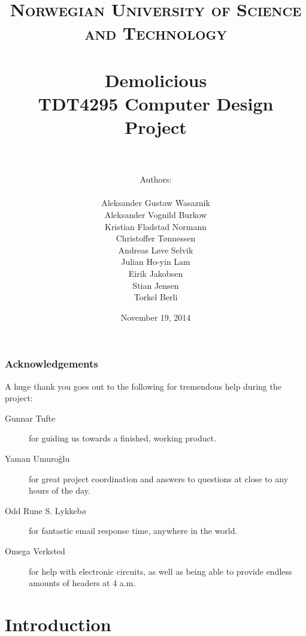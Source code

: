 \documentclass[a4paper, fontsize=11pt]{report} %
\title{ 
\normalfont \normalsize 
\textsc{Norwegian University of Science and Technology} \\ [25pt] %
\horrule{0.5pt} \\[0.4cm] %
\huge \textbf{Demolicious} \\ %
TDT4295 Computer Design Project\\
\horrule{2pt} \\[0.5cm] %
}
\author{Authors:\\ \\
Aleksander Gustaw Wasaznik\\
Aleksander Vognild Burkow\\
Kristian Fladstad Normann\\
Christoffer Tønnessen\\
Andreas Løve Selvik\\
Julian Ho-yin Lam\\
Eirik Jakobsen\\
Stian Jensen\\
Torkel Berli}
\date{\normalsize November 19, 2014}
\begin{document}

\maketitle

\newpage

\listoftodos
{}
\newpage



\thispagestyle{firststyle}

\newpage



\newpage

\section*{Acknowledgements}
A huge thank you goes out to the following for tremendous help during the project:

\vspace*{\fill}
\begin{description}

    \item[Gunnar Tufte]
        for guiding us towards a finished, working product.
    \item[Yaman Umuroğlu]
        for great project coordination and answers to questions at close to any hours of the day.
    \item[Odd Rune S. Lykkebø]
        for fantastic email response time, anywhere in the world.
    \item[Omega Verksted]
        for help with electronic circuits, as well as being able to provide endless amounts of headers at 4 a.m.

\end{description}
\vspace*{\fill}

\newpage

\tableofcontents

\setcounter{secnumdepth}{3}

\newpage


\part{Introduction}


\end{document}
